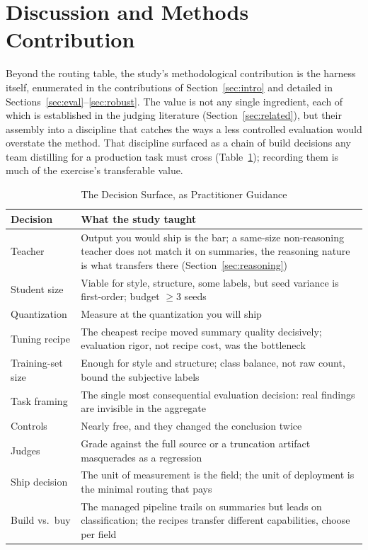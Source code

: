 \documentclass[10pt,journal]{IEEEtran}
\begin{document}
\section{Discussion and Methods Contribution}\label{sec:methods}
Beyond the routing table, the study's methodological contribution is the harness itself, enumerated in the contributions of Section~\ref{sec:intro} and detailed in Sections~\ref{sec:eval}--\ref{sec:robust}. The value is not any single ingredient, each of which is established in the judging literature (Section~\ref{sec:related}), but their assembly into a discipline that catches the ways a less controlled evaluation would overstate the method. That discipline surfaced as a chain of build decisions any team distilling for a production task must cross (Table~\ref{tab:decisions}); recording them is much of the exercise's transferable value.

\begin{table}[t]
\centering
\caption{The Decision Surface, as Practitioner Guidance}
\label{tab:decisions}
\small
\setlength{\tabcolsep}{4pt}\begin{tabular}{@{}p{2.0cm}p{5.05cm}@{}}
\toprule
Decision & What the study taught \\
\midrule
Teacher & Output you would ship is the bar; a same-size non-reasoning teacher does not match it on summaries, the reasoning nature is what transfers there (Section~\ref{sec:reasoning}) \\
Student size & Viable for style, structure, some labels, but seed variance is first-order; budget $\geq3$ seeds \\
Quantization & Measure at the quantization you will ship \\
Tuning recipe & The cheapest recipe moved summary quality decisively; evaluation rigor, not recipe cost, was the bottleneck \\
Training-set size & Enough for style and structure; class balance, not raw count, bound the subjective labels \\
Task framing & The single most consequential evaluation decision: real findings are invisible in the aggregate \\
Controls & Nearly free, and they changed the conclusion twice \\
Judges & Grade against the full source or a truncation artifact masquerades as a regression \\
Ship decision & The unit of measurement is the field; the unit of deployment is the minimal routing that pays \\
Build vs.\ buy & The managed pipeline trails on summaries but leads on classification; the recipes transfer different capabilities, choose per field \\
\bottomrule
\end{tabular}
\end{table}
\end{document}
